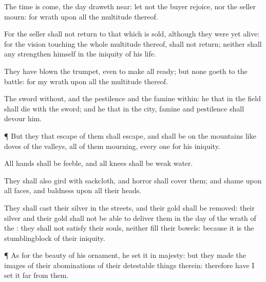 {The
time is
come, the
day draweth
near: let not the
buyer
rejoice, nor the
seller
mourn: for
wrath
{} upon all the
multitude thereof.

For the
seller shall not
return to that which is
sold, although they were yet
alive: for the
vision
{} touching the whole
multitude thereof,
{} shall not
return; neither shall
any
strengthen himself in the
iniquity of his
life.

They have
blown the
trumpet, even to make all
ready; but none
goeth to the
battle: for my
wrath
{} upon all the
multitude thereof.

The
sword
{}
without, and the
pestilence and the
famine
within: he that
{} in the
field shall
die with the
sword; and he that
{} in the
city,
famine and
pestilence shall
devour him.


\par }{\PP {}¶ But they that
escape of them shall
escape, and shall be on the
mountains like
doves of the
valleys, all of them
mourning, every
one for his
iniquity.

All
hands shall be
feeble, and all
knees shall be
weak
{}
water.

They shall also
gird
{} with
sackcloth, and
horror shall
cover them; and
shame
{} upon all
faces, and
baldness upon all their
heads.

They shall
cast their
silver in the
streets, and their
gold shall be
removed: their
silver and their
gold shall not be
able to
deliver them in the
day of the
wrath of the
{}: they shall not
satisfy their
souls, neither
fill their
bowels: because it is the
stumblingblock of their
iniquity.


\par }{\PP {}¶ As for the
beauty of his
ornament, he
set it in
majesty: but they
made the
images of their
abominations
{} of their detestable
things therein: therefore have I
set it
far from them.

}
